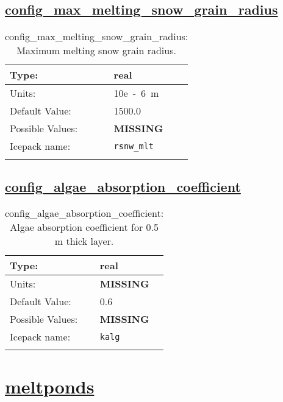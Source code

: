 \subsection[config\_max\_melting\_snow\_grain\_radius]{\hyperref[sec:nm_tab_shortwave]{config\_max\_melting\_snow\_grain\_radius}}
\label{subsec:nm_sec_config_max_melting_snow_grain_radius}
\begin{center}
\begin{longtable}{| p{2.0in} || p{4.0in} |}
    \hline
    Type: & real \\
    \hline
    Units: & \si{10e-6.m} \\
    \hline
    Default Value: & 1500.0 \\
    \hline
    Possible Values: & {\bf \color{red} MISSING} \\
    \hline
    Icepack name: & \verb+rsnw_mlt+ \\
    \hline
    \caption{config\_max\_melting\_snow\_grain\_radius: Maximum melting snow grain radius.}
\end{longtable}
\end{center}
\subsection[config\_algae\_absorption\_coefficient]{\hyperref[sec:nm_tab_shortwave]{config\_algae\_absorption\_coefficient}}
\label{subsec:nm_sec_config_algae_absorption_coefficient}
\begin{center}
\begin{longtable}{| p{2.0in} || p{4.0in} |}
    \hline
    Type: & real \\
    \hline
    Units: & {\bf \color{red} MISSING} \\
    \hline
    Default Value: & 0.6 \\
    \hline
    Possible Values: & {\bf \color{red} MISSING} \\
    \hline
    Icepack name: & \verb+kalg+ \\
    \hline
    \caption{config\_algae\_absorption\_coefficient: Algae absorption coefficient for 0.5 m thick layer.}
\end{longtable}
\end{center}
\section[meltponds]{\hyperref[sec:nm_tab_meltponds]{meltponds}}
\label{sec:nm_sec_meltponds}
